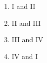 \documentclass[journal,12pt,onecolumn]{IEEEtran}
\theoremstyle{remark}
\begin{document}
\begin{enumerate}
\begin{figure}[!ht]
\label{fig:my_label}
\end{figure}

\begin{enumerate}
\item I and II
\item II and III
\item III and IV
\item IV and I
\end{enumerate}
\end{enumerate} 
\end{document}
